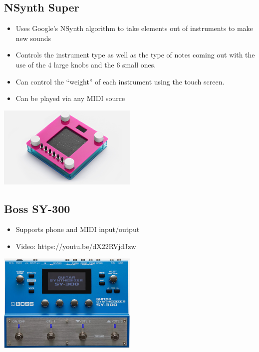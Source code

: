 \documentclass{article}
\begin{document}
\subsection*{NSynth Super}

\begin{itemize}
	\item Uses Google’s NSynth algorithm to take elements out of instruments to make new sounds
	\item Controls the instrument type as well as the type of notes coming out with the use of the 4 large knobs and the 6 small ones.
	\item Can control the “weight” of each instrument using the touch screen.
	\item Can be played via any MIDI source
\end{itemize}

\begin{center}
\includegraphics[width=0.5\textwidth]{mt7.jpg}
\end{center}

\subsection*{Boss SY-300}

\begin{itemize}
	\item Supports phone and MIDI input/output
	\item Video: https://youtu.be/dX22RVjdJzw
\end{itemize}

\begin{center}
\includegraphics[width=0.5\textwidth]{mt8.jpg}
\end{center}
\end{document}
